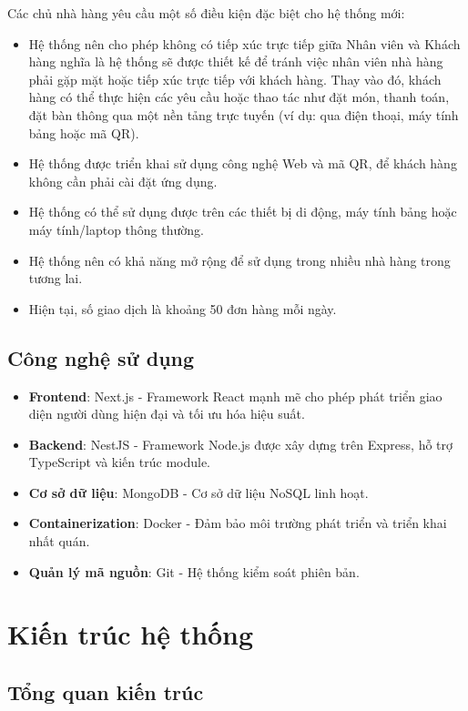 \documentclass[a4paper]{article}
\begin{document}
Các chủ nhà hàng yêu cầu một số điều kiện đặc biệt cho hệ thống mới:
\begin{itemize}
\item Hệ thống nên cho phép không có tiếp xúc trực tiếp giữa Nhân viên và Khách hàng nghĩa là hệ
thống sẽ được thiết kế để tránh việc nhân viên nhà hàng phải gặp mặt hoặc tiếp xúc trực tiếp với khách
hàng. Thay vào đó, khách hàng có thể thực hiện các yêu cầu hoặc thao tác như đặt món, thanh toán, đặt
bàn thông qua một nền tảng trực tuyến (ví dụ: qua điện thoại, máy tính bảng hoặc mã QR).
\item Hệ thống được triển khai sử dụng công nghệ Web và mã QR, để khách hàng không cần phải cài
đặt ứng dụng.
\item Hệ thống có thể sử dụng được trên các thiết bị di động, máy tính bảng hoặc máy tính/laptop
thông thường.
\item Hệ thống nên có khả năng mở rộng để sử dụng trong nhiều nhà hàng trong tương lai.
\item Hiện tại, số giao dịch là khoảng 50 đơn hàng mỗi ngày.
\end{itemize}

\subsection{Công nghệ sử dụng}
\begin{itemize}
\item \textbf{Frontend}: Next.js - Framework React mạnh mẽ cho phép phát triển giao diện người dùng hiện đại và tối ưu hóa hiệu suất.
\item \textbf{Backend}: NestJS - Framework Node.js được xây dựng trên Express, hỗ trợ TypeScript và kiến trúc module.
\item \textbf{Cơ sở dữ liệu}: MongoDB - Cơ sở dữ liệu NoSQL linh hoạt.
\item \textbf{Containerization}: Docker - Đảm bảo môi trường phát triển và triển khai nhất quán.
\item \textbf{Quản lý mã nguồn}: Git - Hệ thống kiểm soát phiên bản.
\end{itemize}
\section{Kiến trúc hệ thống}
    \subsection{Tổng quan kiến trúc}
    
\end{document}
